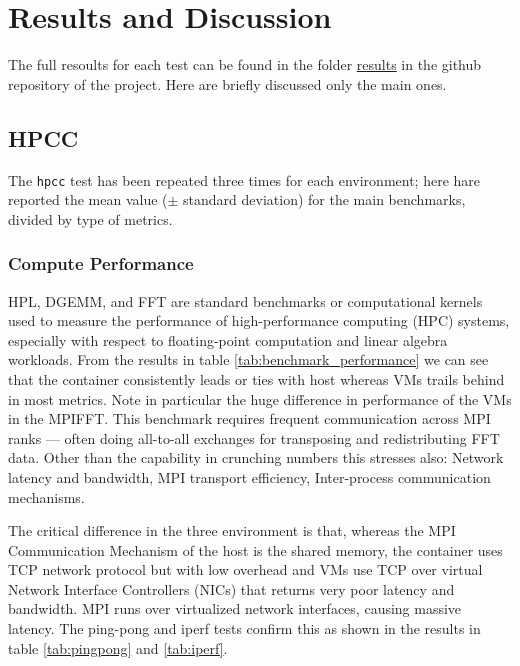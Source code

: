 \section{Results and Discussion}

The full resoults for each test can be found in the folder \href{https://github.com/giovanni-lucarelli/cloud-basic/tree/main/results}{results} in the github repository of the project. Here are briefly discussed only the main ones.

\subsection{HPCC}

The \texttt{hpcc} test has been repeated three times for each environment; here hare reported the mean value ($\pm$ standard deviation) for the main benchmarks, divided by type of metrics.

\subsubsection{Compute Performance}

HPL, DGEMM, and FFT are standard benchmarks or computational kernels used to measure the performance of high-performance computing (HPC) systems, especially with respect to floating-point computation and linear algebra workloads. From the results in table \ref{tab:benchmark_performance} we can see that the container consistently leads or ties with host whereas VMs trails behind in most metrics.
Note in particular the huge difference in performance of the VMs in the MPIFFT. This benchmark requires frequent communication across MPI ranks — often doing all-to-all exchanges for transposing and redistributing FFT data. Other than the capability in crunching numbers this stresses also: Network latency and bandwidth, MPI transport efficiency,  Inter-process communication mechanisms.

The critical difference in the three environment is that, whereas the MPI Communication Mechanism of the host is the shared memory, the container uses TCP network protocol but with low overhead and 
VMs use	TCP over virtual Network Interface Controllers (NICs) that returns very poor latency and bandwidth. MPI runs over virtualized network interfaces, causing massive latency. The ping-pong and iperf tests confirm this as shown in the results in table \ref{tab:pingpong} and \ref{tab:iperf}.

